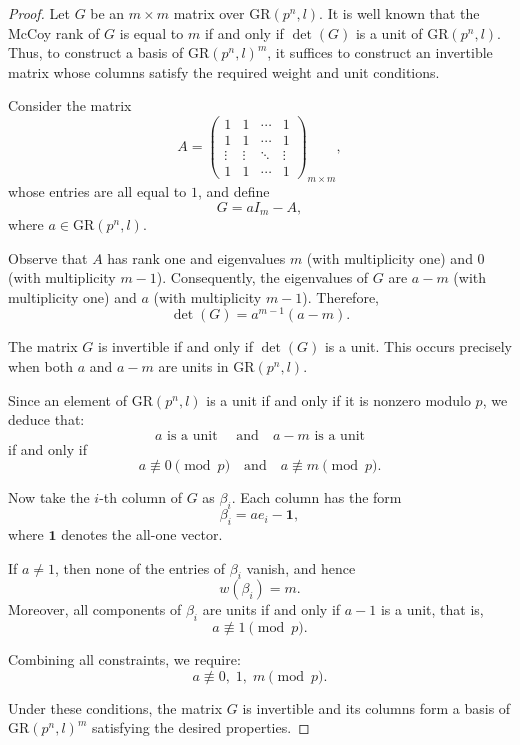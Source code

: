 \documentclass[10pt]{article}
\theoremstyle{definition}
\begin{document}
\begin{proof}
Let $G$ be an $m\times m$ matrix over $\mathrm{GR}(p^n,l)$. It is well known that the McCoy rank of $G$ is equal to $m$ if and only if $\det(G)$ is a unit of $\mathrm{GR}(p^n,l)$. Thus, to construct a basis of $\mathrm{GR}(p^n,l)^m$, it suffices to construct an invertible matrix whose columns satisfy the required weight and unit conditions.

Consider the matrix
\[
A=\begin{pmatrix}
1 & 1 & \cdots & 1\\
1 & 1 & \cdots & 1\\
\vdots & \vdots & \ddots & \vdots\\
1 & 1 & \cdots & 1
\end{pmatrix}_{m\times m},
\]
whose entries are all equal to $1$, and define
\[
G = aI_m - A,
\]
where $a\in \mathrm{GR}(p^n,l)$.

Observe that $A$ has rank one and eigenvalues $m$ (with multiplicity one) and $0$ (with multiplicity $m-1$). Consequently, the eigenvalues of $G$ are $a-m$ (with multiplicity one) and $a$ (with multiplicity $m-1$). Therefore,
\[
\det(G)=a^{m-1}(a-m).
\]

The matrix $G$ is invertible if and only if $\det(G)$ is a unit. This occurs precisely when both $a$ and $a-m$ are units in $\mathrm{GR}(p^n,l)$.

Since an element of $\mathrm{GR}(p^n,l)$ is a unit if and only if it is nonzero modulo $p$, we deduce that:
\[
a \text{ is a unit } \quad \text{and} \quad a-m \text{ is a unit}
\]
if and only if
\[
a \not\equiv 0 \pmod p
\quad \text{and} \quad
a \not\equiv m \pmod p.
\]

Now take the $i$-th column of $G$ as $\beta_i$. Each column has the form
\[
\beta_i = a e_i - \mathbf{1},
\]
where $\mathbf{1}$ denotes the all-one vector.

If $a\neq 1$, then none of the entries of $\beta_i$ vanish, and hence
\[
w(\beta_i)=m.
\]
Moreover, all components of $\beta_i$ are units if and only if $a-1$ is a unit, that is,
\[
a \not\equiv 1 \pmod p.
\]

Combining all constraints, we require:
\[
a \not\equiv 0, \; 1, \; m \pmod p.
\]

Under these conditions, the matrix $G$ is invertible and its columns form a basis of $\mathrm{GR}(p^n,l)^m$ satisfying the desired properties.
\end{proof}
\end{document}
